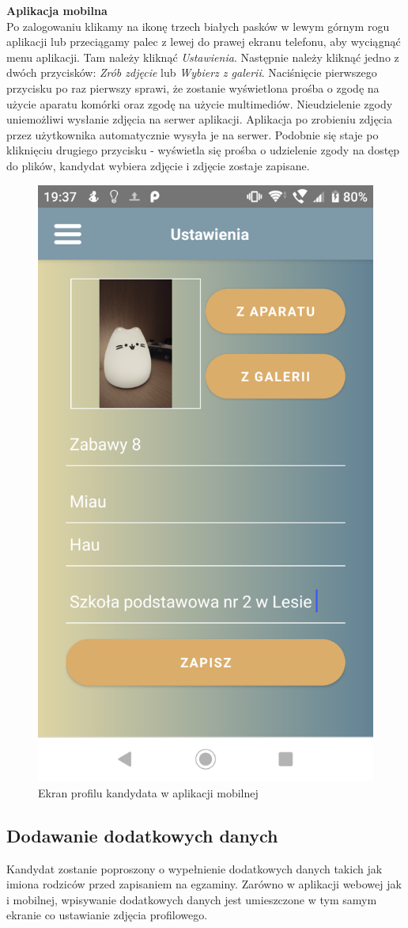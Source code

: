 \documentclass{article}
\begin{document}
\textbf{Aplikacja mobilna} \\
Po zalogowaniu klikamy na ikonę trzech białych pasków w lewym górnym rogu aplikacji lub przeciągamy palec z lewej do prawej ekranu telefonu, aby wyciągnąć menu aplikacji. Tam należy kliknąć \emph{Ustawienia}. Następnie należy kliknąć jedno z dwóch przycisków: \emph{Zrób zdjęcie} lub \emph{Wybierz z galerii}. Naciśnięcie pierwszego przycisku po raz pierwszy sprawi, że zostanie wyświetlona prośba o zgodę na użycie aparatu komórki oraz zgodę na użycie multimediów. Nieudzielenie zgody uniemożliwi wysłanie zdjęcia na serwer aplikacji. Aplikacja po zrobieniu zdjęcia przez użytkownika automatycznie wysyła je na serwer. Podobnie się staje po kliknięciu drugiego przycisku - wyświetla się prośba o udzielenie zgody na dostęp do plików, kandydat wybiera zdjęcie i zdjęcie zostaje zapisane.
\begin{figure}[H]
    \centering
    \includegraphics[width=0.45\linewidth]{images/mobile/candidate_settings.png}
    \caption{Ekran profilu kandydata w aplikacji mobilnej}
    \label{fig:test3_label}
\end{figure}

\subsection{Dodawanie dodatkowych danych}
Kandydat zostanie poproszony o wypełnienie dodatkowych danych takich jak imiona rodziców przed zapisaniem na egzaminy. Zarówno w aplikacji webowej jak i mobilnej, wpisywanie dodatkowych danych jest umieszczone w tym samym ekranie co ustawianie zdjęcia profilowego. \\
\end{document}

